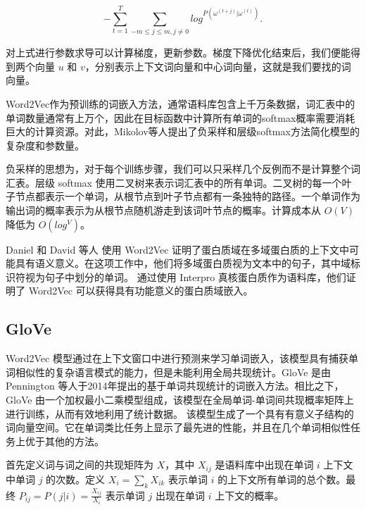\begin{equation}
   -\sum \limits_{t=1}^T \sum \limits_{-m\leq j \leq m, j \neq 0} log^{P(\omega^{(t+j)}|\omega^{(t)})}.
\end{equation}

对上式进行参数求导可以计算梯度，更新参数。梯度下降优化结束后，我们便能得到两个向量 $u$ 和 $v$，分别表示上下文词向量和中心词向量，这就是我们要找的词向量。

Word2Vec作为预训练的词嵌入方法，通常语料库包含上千万条数据，词汇表中的单词数量通常有上万个，因此在目标函数中计算所有单词的softmax概率需要消耗巨大的计算资源。对此，Mikolov等人提出了负采样和层级softmax方法简化模型的复杂度和参数量。

负采样的思想为，对于每个训练步骤，我们可以只采样几个反例而不是计算整个词汇表。层级 softmax 使用二叉树来表示词汇表中的所有单词。二叉树的每一个叶子节点都表示一个单词，从根节点到叶子节点都有一条独特的路径。一个单词作为输出词的概率表示为从根节点随机游走到该词叶节点的概率。计算成本从 $O(V)$ 降低为 $O(log^{V})$。

Daniel 和 David 等人 \cite{buchan2019inferring} 使用 Word2Vec 证明了蛋白质域在多域蛋白质的上下文中可能具有语义意义。在这项工作中，他们将多域蛋白质视为文本中的句子，其中域标识符视为句子中划分的单词。 通过使用 Interpro \cite{finn2017interpro} 真核蛋白质作为语料库，他们证明了 Word2Vec 可以获得具有功能意义的蛋白质域嵌入。


\subsection{GloVe}
Word2Vec 模型通过在上下文窗口中进行预测来学习单词嵌入，该模型具有捕获单词相似性的复杂语言模式的能力，但是未能利用全局共现统计。GloVe \cite{pennington2014glove} 是由 Pennington 等人于2014年提出的基于单词共现统计的词嵌入方法。相比之下，GloVe 由一个加权最小二乘模型组成，该模型在全局单词-单词间共现概率矩阵上进行训练，从而有效地利用了统计数据。 该模型生成了一个具有有意义子结构的词向量空间。它在单词类比任务上显示了最先进的性能，并且在几个单词相似性任务上优于其他的方法。

首先定义词与词之间的共现矩阵为 $X$，其中 $X_{ij}$ 是语料库中出现在单词 $i$ 上下文中单词 $j$ 的次数。定义 $X_i = \sum_{k} X_{ik}$ 表示单词 $i$ 的上下文所有单词的总个数。最终 $P_{ij} = P(j|i) = \frac{X_{ij}}{X_i}$ 表示单词 $j$ 出现在单词 $i$ 上下文的概率。

